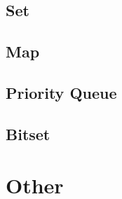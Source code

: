 \subsection{Set}


\subsection{Map}


\subsection{Priority Queue}


\subsection{Bitset}


\section{Other}





